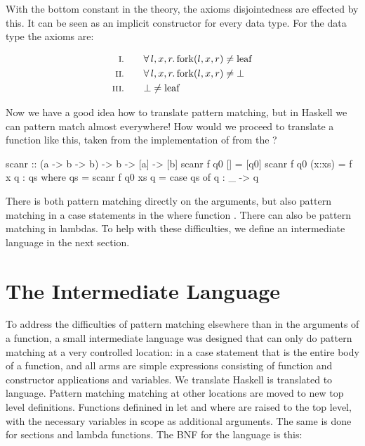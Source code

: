With the bottom constant in the theory, the axioms disjointedness are
effected by this. It can be seen as an implicit constructor for every
data type. For the  data type the axioms are:

\begin{align*}
\rom{1} \qquad & \faaa{l}{x}{r} \fn{fork}(l,x,r) \neq \fn{leaf} \\
\rom{2} \qquad & \faaa{l}{x}{r} \fn{fork}(l,x,r) \neq \bot      \\
\rom{3} \qquad & \bot \neq \fn{leaf}
\end{align*}

Now we have a good idea how to translate pattern matching, but
in Haskell we can pattern match almost everywhere! How would we
proceed to translate a function like this, taken from the
implementation of  from the ?

\begin{code}
scanr             :: (a -> b -> b) -> b -> [a] -> [b]
scanr f q0 []     =  [q0]
scanr f q0 (x:xs) =  f x q : qs
                     where qs = scanr f q0 xs
                           q = case qs of
                                 q : _ -> q
\end{code}

\noindent
There is both pattern matching directly on the arguments, but also
pattern matching in a case statements in the where function
. There can also be pattern matching in lambdas. To help with
these difficulties, we define an intermediate language in the next
section.

\section{The Intermediate Language}

To address the difficulties of pattern matching elsewhere than in the
arguments of a function, a small intermediate language was designed
that can only do pattern matching at a very controlled location: in a
case statement that is the entire body of a function, and all arms are
simple expressions consisting of function and constructor applications
and variables. We translate Haskell is translated to language. Pattern
matching matching at other locations are moved to new top level
definitions. Functions definined in let and where are raised to the
top level, with the necessary variables in scope as additional
arguments. The same is done for sections and lambda functions. The BNF
for the language is this:

